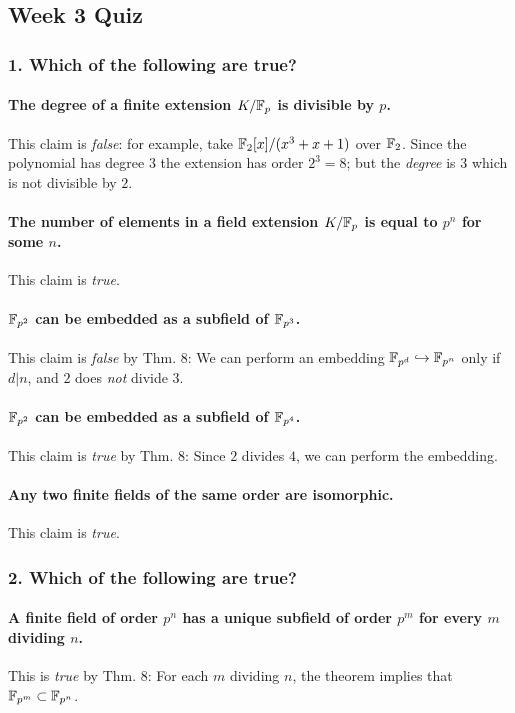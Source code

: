 \subsection[Quiz]{Week 3 Quiz}
\subsubsection*{1. Which of the following are true?}
\paragraph*{The degree of a finite extension $K / \mathbb{F}_p$ is divisible by $p$.}
This claim is \emph{false}: for example, take $\mathbb{F}_2[x]/(x^3 + x + 1)$ over $\mathbb{F}_2$. 
Since the polynomial has degree $3$ the extension has order $2^3 = 8$; but the \emph{degree} is $3$ which is not divisible by $2$.

\paragraph*{The number of elements in a field extension $K / \mathbb{F}_p$ is equal to $p^n$ for some $n$.}
This claim is \emph{true}.

\paragraph*{$\mathbb{F}_{p^2}$ can be embedded as a subfield of $\mathbb{F}_{p^3}$.}
This claim is \emph{false} by Thm. 8: We can perform an embedding $\mathbb{F}_{p^d} \hookrightarrow \mathbb{F}_{p^n}$ only if $d | n$, and $2$ does \emph{not} divide $3$.

\paragraph*{$\mathbb{F}_{p^2}$ can be embedded as a subfield of $\mathbb{F}_{p^4}$.}
This claim is \emph{true} by Thm. 8: Since $2$ divides $4$, we can perform the embedding.

\paragraph*{Any two finite fields of the same order are isomorphic.}
This claim is \emph{true}.

\subsubsection*{2. Which of the following are true?}
\paragraph*{A finite field of order $p^n$ has a unique subfield of order $p^m$ for every $m$ dividing $n$.}
This is \emph{true} by Thm. 8: For each $m$ dividing $n$, the theorem implies that $\mathbb{F}_{p^m} \subset \mathbb{F}_{p^n}$.

